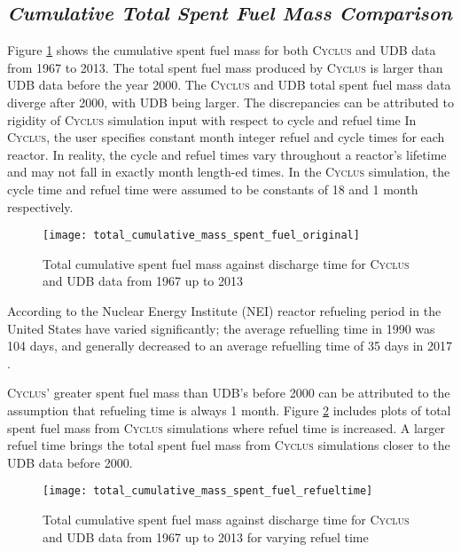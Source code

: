 \documentclass{anstrans}
\newcommand{\Cyclus}{\textsc{Cyclus}\xspace}%
\begin{document}
\subsection{\textit{Cumulative Total Spent Fuel Mass Comparison}}
Figure \ref{fig:total_original} shows the cumulative spent fuel mass for both \Cyclus and UDB data from 1967 to 2013. The total spent fuel mass produced by \Cyclus is larger than UDB data before the year 2000. The \Cyclus and UDB total spent fuel mass data diverge after 2000, with UDB being larger. The discrepancies can be attributed to rigidity of \Cyclus simulation input with respect to cycle and refuel time %
In \Cyclus, the user specifies constant month integer refuel and cycle times for each reactor. In reality, the cycle and refuel times vary throughout a reactor's lifetime and may not fall in exactly month length-ed times. In the \Cyclus simulation, the cycle time and refuel time were assumed to be constants of 18 and 1 month respectively.

\begin{figure}[ht] %
	\centering
	\texttt{[image: total\_cumulative\_mass\_spent\_fuel\_original]}
	\caption{Total cumulative spent fuel mass against discharge time for \Cyclus and UDB data from 1967 up to 2013}
	\label{fig:total_original}
\end{figure}

According to the Nuclear Energy Institute (NEI) reactor refueling period in the United States have varied significantly; the average refuelling time in 1990 was 104 days, and generally decreased to an average refuelling time of 35 days in 2017 \cite{nei}.

\Cyclus' greater spent fuel mass than UDB's before 2000 can be attributed to the assumption that refueling time is always 1 month. Figure \ref{fig:total_refueltime} includes plots of total spent fuel mass from \Cyclus simulations where refuel time is increased. A larger refuel time brings the total spent fuel mass from \Cyclus simulations closer to the UDB data before 2000. 

\begin{figure}[ht] %
	\centering
	\texttt{[image: total\_cumulative\_mass\_spent\_fuel\_refueltime]}
	\caption{Total cumulative spent fuel mass against discharge time for \Cyclus and UDB data from 1967 up to 2013 for varying refuel time}
	\label{fig:total_refueltime}
\end{figure} 
\end{document}
